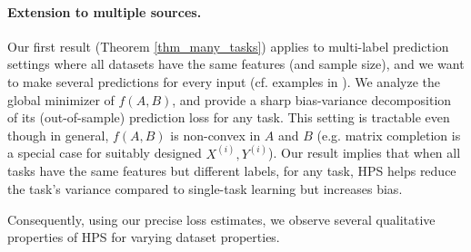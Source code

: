 \paragraph{Extension to multiple sources.}
Our first result (Theorem \ref{thm_many_tasks}) applies to multi-label prediction settings where all datasets have the same features (and sample size), and we want to make several predictions for every input (cf. examples in \cite{hsu2009multi}).
We analyze the global minimizer of $f(A, B)$, and provide a sharp bias-variance decomposition of its (out-of-sample) prediction loss for any task.
This setting is tractable even though in general, $f(A, B)$ is non-convex in $A$ and $B$ (e.g. matrix completion is a special case for suitably designed $X^{(i)}, Y^{(i)}$).
Our result implies that when all tasks have the same features but different labels, for any task, HPS helps reduce the task's variance compared to single-task learning but increases bias.


Consequently, using our precise loss estimates, we observe several qualitative properties of HPS for varying dataset properties.




